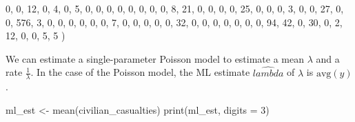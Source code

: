\documentclass[
]{book}
\newenvironment{Shaded}{\begin{snugshade}}{\end{snugshade}}
\newcommand{\AttributeTok}[1]{\textcolor[rgb]{0.77,0.63,0.00}{#1}}
\newcommand{\DecValTok}[1]{\textcolor[rgb]{0.00,0.00,0.81}{#1}}
\newcommand{\FunctionTok}[1]{\textcolor[rgb]{0.00,0.00,0.00}{#1}}
\newcommand{\NormalTok}[1]{#1}
\newcommand{\OtherTok}[1]{\textcolor[rgb]{0.56,0.35,0.01}{#1}}
\begin{document}
\begin{Shaded}
\begin{Highlighting}[]
                          \DecValTok{0}\NormalTok{, }\DecValTok{0}\NormalTok{, }\DecValTok{12}\NormalTok{, }\DecValTok{0}\NormalTok{, }\DecValTok{4}\NormalTok{, }\DecValTok{0}\NormalTok{, }\DecValTok{5}\NormalTok{, }\DecValTok{0}\NormalTok{, }\DecValTok{0}\NormalTok{, }\DecValTok{0}\NormalTok{, }\DecValTok{0}\NormalTok{, }\DecValTok{0}\NormalTok{, }\DecValTok{0}\NormalTok{, }\DecValTok{0}\NormalTok{, }\DecValTok{0}\NormalTok{, }\DecValTok{8}\NormalTok{, }\DecValTok{21}\NormalTok{, }\DecValTok{0}\NormalTok{, }\DecValTok{0}\NormalTok{, }\DecValTok{0}\NormalTok{, }\DecValTok{0}\NormalTok{, }\DecValTok{25}\NormalTok{, }\DecValTok{0}\NormalTok{, }\DecValTok{0}\NormalTok{, }\DecValTok{0}\NormalTok{,}
                          \DecValTok{3}\NormalTok{, }\DecValTok{0}\NormalTok{, }\DecValTok{0}\NormalTok{, }\DecValTok{27}\NormalTok{, }\DecValTok{0}\NormalTok{, }\DecValTok{0}\NormalTok{, }\DecValTok{576}\NormalTok{, }\DecValTok{3}\NormalTok{, }\DecValTok{0}\NormalTok{, }\DecValTok{0}\NormalTok{, }\DecValTok{0}\NormalTok{, }\DecValTok{0}\NormalTok{, }\DecValTok{0}\NormalTok{, }\DecValTok{0}\NormalTok{, }\DecValTok{7}\NormalTok{, }\DecValTok{0}\NormalTok{, }\DecValTok{0}\NormalTok{, }\DecValTok{0}\NormalTok{, }\DecValTok{0}\NormalTok{, }\DecValTok{0}\NormalTok{, }\DecValTok{32}\NormalTok{, }\DecValTok{0}\NormalTok{, }\DecValTok{0}\NormalTok{, }\DecValTok{0}\NormalTok{, }\DecValTok{0}\NormalTok{,}
                          \DecValTok{0}\NormalTok{, }\DecValTok{0}\NormalTok{, }\DecValTok{0}\NormalTok{, }\DecValTok{94}\NormalTok{, }\DecValTok{42}\NormalTok{, }\DecValTok{0}\NormalTok{, }\DecValTok{30}\NormalTok{, }\DecValTok{0}\NormalTok{, }\DecValTok{2}\NormalTok{, }\DecValTok{12}\NormalTok{, }\DecValTok{0}\NormalTok{, }\DecValTok{0}\NormalTok{, }\DecValTok{5}\NormalTok{, }\DecValTok{5}\NormalTok{ ) }
\end{Highlighting}
\end{Shaded}

We can estimate a single-parameter Poisson model to estimate a mean \(\lambda\) and a rate \(\frac{1}{\lambda}\). In the case of the Poisson model, the ML estimate \(\hat{lambda}\) of \(\lambda\) is \(\text{avg}(y)\).

\begin{Shaded}
\begin{Highlighting}[]
\NormalTok{ml\_est }\OtherTok{\textless{}{-}} \FunctionTok{mean}\NormalTok{(civilian\_casualties)}
\FunctionTok{print}\NormalTok{(ml\_est, }\AttributeTok{digits =} \DecValTok{3}\NormalTok{)}
\end{Highlighting}
\end{Shaded}
\end{document}
